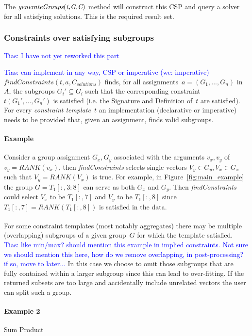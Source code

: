 \documentclass{sig-alternate-05-2015}
\newcommand{\tias}[1]{\textcolor{blue}{{\sc Tias:} #1}\xspace}
\newcommand{\format}[1]{\textit{#1}\xspace}
\newcommand{\generategroups}{\format{generateGroups}}
\newcommand{\findassignment}{\format{findConstraints}}
\newcommand{\template}{\format{constraint template}}
\newcommand{\CSignature}{Signature\xspace}
\newcommand{\CFunction}{Definition\xspace}
\newcommand{\range}[3]{\ensuremath{#1[#2,#3]}}
\newcommand{\rangeto}[2]{#1{:}#2}
\newcommand{\rangeall}{:}
\newcommand{\eccalc}[2]{\ensuremath{#1 = #2}}
\newcommand{\ecrank}[2]{\eccalc{#1}{\mathit{RANK}(#2)}}
\begin{document}
The $\generategroups(\textit{t,{\cal G},C})$ method will construct this CSP and query a solver for all satisfying solutions. This is the required result set.

\subsubsection{Constraints over satisfying subgroups}
\tias{I have not yet reworked this part}

\tias{can implement in any way, CSP or imperative (we: imperative)}
$\findassignment(t,a,C_{solutions})$ finds, for all assignments~$a = (G_1, ..., G_n)$ in $A$, the subgroups $G_i' \subseteq G_i$ such that the corresponding constraint $t(G_1', ..., G_n')$ is satisfied (i.e. the \CSignature and \CFunction of~$t$ are satisfied).
For every \template~$t$ an implementation (declarative or imperative) needs to be provided that, given an assignment, finds valid subgroups.


\paragraph{Example}
Consider a group assignment $G_x, G_y$ associated with the arguments $v_x,v_y$ of \ecrank{v_y}{v_x}, then \findassignment selects single vectors $V_y \in G_y, V_x \in G_x$ such that \ecrank{V_y}{V_x} is true.
For example, in Figure~\ref{fig:main_example} the group $G = \range{T_1}{\rangeall}{\rangeto{3}{8}}$ can serve as both $G_x$ and $G_y$.
Then \findassignment could select $V_x$ to be $\range{T_1}{\rangeall}{7}$ and $V_y$ to be $\range{T_1}{\rangeall}{8}$ since \ecrank{\range{T_1}{\rangeall}{7}}{\range{T_1}{\rangeall}{8}} is satisfied in the data.
\\\\
For some constraint templates (most notably aggregates) there may be multiple (overlapping) subgroups of a given group~$G$ for which the template satisfied.
\tias{like min/max? should mention this example in implied constraints. Not sure we should mention this here, how do we remove overlapping, in post-processing? if so, move to later...}
In this case we choose to omit those subgroups that are fully contained within a larger subgroup since this can lead to over-fitting.
If the returned subsets are too large and accidentally include unrelated vectors the user can split such a group.

\paragraph{Example 2}
Sum Product
\end{document}
